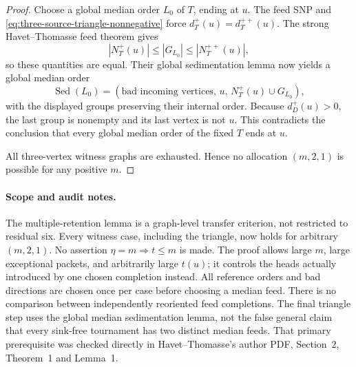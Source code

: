 \begin{proof}
Choose a global median order $L_0$ of $T$, ending at $u$.
The feed SNP and \eqref{eq:three-source-triangle-nonnegative} force
$d_T^+(u)=d_T^{++}(u)$.  The strong Havet--Thomasse feed theorem
\cite[Theorem~1 and its proof]{HavetThomasse2000} gives
\[
 |N_T^+(u)|\le |G_{L_0}|\le |N_T^{++}(u)|,
\]
so these quantities are equal.  Their global sedimentation lemma
\cite[Lemma~1]{HavetThomasse2000} now yields a global median order
\[
 \operatorname{Sed}(L_0)=
 (\text{bad incoming vertices},\,u,\,N_T^+(u)\cup G_{L_0}),
\]
with the displayed groups preserving their internal order.
Because $d_D^+(u)>0$, the last group is nonempty and its last vertex
is not $u$.  This contradicts the conclusion that every global median
order of the fixed $T$ ends at $u$.

All three-vertex witness graphs are exhausted.  Hence no allocation
$(m,2,1)$ is possible for any positive $m$.
\end{proof}

\paragraph{Scope and audit notes.}
The multiple-retention lemma is a graph-level transfer criterion,
not restricted to residual six.  Every witness case, including the
triangle, now holds for arbitrary $(m,2,1)$.  No assertion
$\eta=m\Rightarrow t\le m$ is made.  The proof allows large $m$,
large exceptional packets, and arbitrarily large $t(u)$; it controls
the heads actually introduced by one chosen completion instead.
All reference orders and bad directions are chosen once per case
before choosing a median feed.  There is no comparison between
independently reoriented feed completions.  The final triangle step
uses the global median sedimentation lemma, not the false general
claim that every sink-free tournament has two distinct median feeds.
That primary prerequisite was checked directly in Havet--Thomasse's
author PDF, Section~2, Theorem~1 and Lemma~1.
